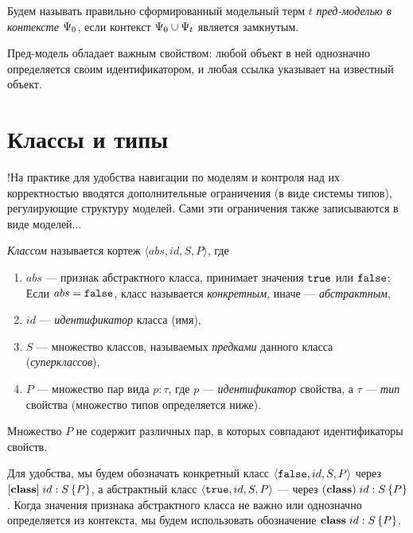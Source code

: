 \begin{Def}
Будем называть правильно сформированный модельный терм $t$ \emph{пред-моделью в контексте $\Psi_0$}, если контекст $\Psi_0 \cup \Psi_t$ является замкнутым.
\end{Def}

Пред-модель обладает важным свойством: любой объект в ней однозначно определяется своим идентификатором, и любая ссылка указывает на известный объект.

\section{Классы и типы}

!На практике для удобства навигации по моделям и контроля над их корректностью вводятся дополнительные ограничения (в виде системы типов), регулирующие структуру моделей. Сами эти ограничения также записываются в виде моделей...

\begin{Def}[Класс]
\emph{Классом} называется кортеж $\langle abs, id, S, P \rangle$, где 
\begin{enumerate}
\item $abs$ --- признак абстрактного класса, принимает значения $\mathtt{true}$ или $\mathtt{false}$; Если $abs = \mathtt{false}$, класс называется \emph{конкретным}, иначе --- \emph{абстрактным},
\item $id$ --- \emph{идентификатор} класса (имя),
\item $S$ --- множество классов, называемых \emph{предками} данного класса (\emph{суперклассов}),
\item $P$ --- множество пар вида $p : \tau$, где $p$ --- \emph{идентификатор} свойства, а $\tau$ --- \emph{тип} свойства (множество типов определяется ниже).
\end{enumerate}
Множество $P$ не содержит различных пар, в которых совпадают идентификаторы свойств.
\end{Def}

Для удобства, мы будем обозначать конкретный класс $\langle \mathtt{false}, id, S, P \rangle$ через \mbox{$\mathbf{[class]}\;id : S \left\{P\right\}$}, а абстрактный класс $\langle \mathtt{true}, id, S, P \rangle$ --- через \mbox{$\mathbf{(class)}\;id : S \left\{P\right\}$}. Когда значения признака абстрактного класса не важно или однозначно определяется из контекста, мы будем использовать обозначение \mbox{$\mathbf{class}\;id : S \left\{P\right\}$}.


